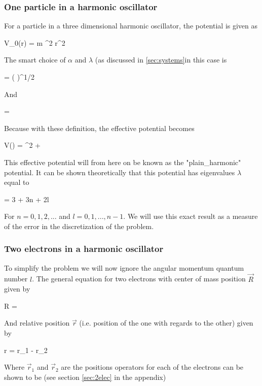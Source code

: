 \documentclass[a4paper,10pt,english]{article}
\numberwithin{figure}{subsection}
\numberwithin{table}{subsection}
\numberwithin{equation}{subsection}
\begin{document}
\subsubsection{One particle in a harmonic oscillator}

For a particle in a three dimensional harmonic oscillator, the potential is given as 

\eqs V_0(r) =  m \omega^2 r^2 \eqf

The smart choice of $\alpha$ and $\lambda$ (as discussed in \ref{sec:systems}in this case is 

\eqs \alpha = \left (  \right )^{1/2} \eqf

And 

\eqs \lambda =  \eqf

Because with these definition, the effective potential becomes 

\eqs V(\rho) = \rho^2 +  \eqf

This effective potential will from here on be known as the 
"plain\_harmonic" potential.
It can be shown theoretically that this potential has eigenvalues $\lambda$ 
equal to 

\eqs
\lambda = 3 + 3n + 2l 
\label{eq:eig}
\eqf

For $n=0,1,2,...$ and $l = 0,1,...,n-1$. 
We will use this exact result as a measure of the error in the discretization of the 
problem. 








\subsubsection{Two electrons in a harmonic oscillator}\label{sec:theo2elec}

To simplify the problem we will now ignore the angular momentum quantum number $l$.
The general equation for two electrons with center of mass position $\vec R$ given by

\eqs \vec R =  \eqf

And relative position $\vec r$ (i.e. position of the one with regards to the other) given by

\eqs \vec r = \vec r_1 - \vec r_2 \eqf

Where $\vec r_1$ and $\vec r_2$ are the positions operators for each of the electrons can be shown 
to be (see section \ref{sec:2elec} in the appendix)
\end{document}
